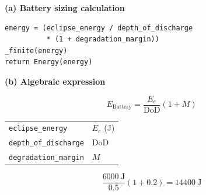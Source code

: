 \documentclass[border=5pt]{standalone}
\begin{document}
\begin{minipage}{510pt}
\fontsize{10}{12}\selectfont
\begin{minipage}[t]{270pt}
\vspace{0pt}\textbf{(a) Battery sizing calculation}\par\smallskip
\begin{lstlisting}[style=report-python,basicstyle=\ttfamily\fontsize{8}{10.24}\selectfont]
energy = (eclipse_energy / depth_of_discharge
          * (1 + degradation_margin))
_finite(energy)
return Energy(energy)
\end{lstlisting}
\end{minipage}\hfill
\begin{minipage}[t]{230pt}
\vspace{0pt}\textbf{(b) Algebraic expression}\par\smallskip
\[
E_{\mathrm{Battery}}=\frac{E_e}{\mathrm{DoD}}(1+M)
\]
\begin{tabular}{@{}ll@{}}
\texttt{eclipse\_energy} & $E_e$ (J)\\
\texttt{depth\_of\_discharge} & $\mathrm{DoD}$\\
\texttt{degradation\_margin} & $M$
\end{tabular}
\[
\frac{6000~\mathrm{J}}{0.5}(1+0.2)=14400~\mathrm{J}
\]
\end{minipage}
\end{minipage}
\end{document}
